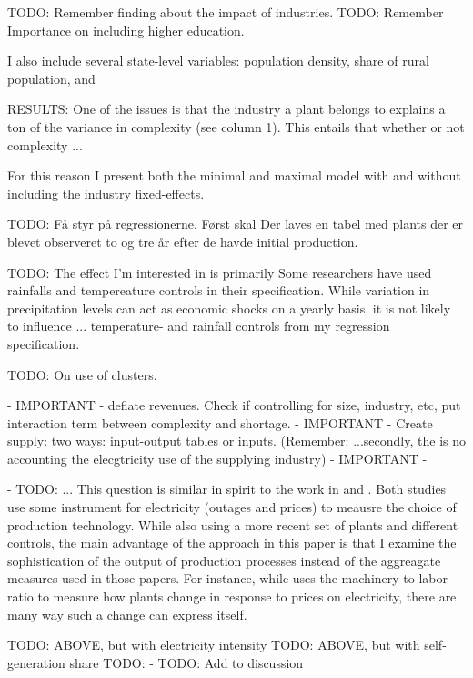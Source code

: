 \documentclass[11pt]{article}
\begin{document}
TODO: Remember finding about the impact of industries.
TODO: Remember Importance on including higher education.

I also include several state-level variables: population density, share of rural population, and 


RESULTS: One of the issues is that the industry a plant belongs to explains a ton of the variance in complexity (see column 1). This entails that whether or not complexity ...

For this reason I present both the minimal and maximal model with and without including the industry fixed-effects.

TODO: Få styr på regressionerne. Først skal Der laves en tabel med plants der er blevet observeret to og tre år efter de havde initial production.

TODO: The effect I'm interested in is primarily 
Some researchers have used rainfalls and tempereature controls in their specification. While variation in precipitation levels can act as economic shocks on a yearly basis, it is not likely to influence ... 
temperature- and rainfall controls from my regression specification.


TODO: On use of clusters. 

 - IMPORTANT - deflate revenues. Check if controlling for size, industry, etc, put interaction term between complexity and shortage.
 - IMPORTANT - Create supply: two ways: input-output tables or inputs. (Remember: ...secondly, the is no accounting the elecgtricity use of the supplying industry)
 - IMPORTANT - 

- TODO: ... This question is similar in spirit to the work in \cite{allcott_how_2016} and \cite{abeberese_electricity_2017}. Both studies use some instrument for electricity (outages and prices) to meausre the choice of production technology. While also using a more recent set of plants and different controls, the main advantage of the approach in this paper is that I examine the sophistication of the output of production processes instead of the aggreagate measures used in those papers. For instance, while \cite{abeberese_electricity_2017} uses the machinery-to-labor ratio to measure how plants change in response to prices on electricity, there are many way such a change can express itself. 





TODO: ABOVE, but with electricity intensity
TODO: ABOVE, but with self-generation share
TODO: 
 - TODO: Add to discussion
\end{document}

